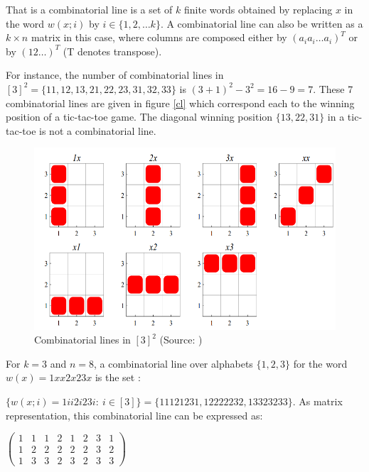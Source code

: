  That is a combinatorial line is a set of $k$ finite words obtained by replacing $x$ in the word $w(x;i)$ by $i \in \{1,2, \ldots k\}.$ A combinatorial line can also be written as a $k \times n$ matrix in this case, where columns are composed either by $(a_ia_i\ldots a_i)^T$ or by  $(12\ldots )^T$ (T denotes transpose).

For instance, the number of combinatorial lines in $[3]^2=\{11,12,13,21,22,23,31,32,33\}$ is $(3+1)^2-3^2=16-9=7.$ These 7 combinatorial lines are given in figure \eqref{cl} which correspond each to the winning position of a tic-tac-toe game. The diagonal winning position $\{13, 22,31\}$ in a tic-tac-toe is not a combinatorial line.
\begin{figure}[hbtp]
\centering
\includegraphics[scale=0.35]{cblines.png}
\caption{Combinatorial lines in $[3]^2$ (Source: \cite{polymath2010density})} \label{cl}
\end{figure}

For $k=3$ and $n=8$, a combinatorial line over alphabets $\{1,2,3\}$ for the word  $w(x)=1xx2x23x$ is the set :

$\{w(x;i)=1ii2i23i: \ i\in [3]\}=  \{11121231, 12222232, 13323233 \}.$ As matrix representation, this combinatorial line can be expressed as:

\begin{center}
$\left(\begin{array}{cccccccc}
1 & 1 & 1 & 2 & 1 & 2& 3 &1\\  1 & 2 & 2 & 2 & 2 & 2 & 3 & 2\\ 1 & 3 & 3 & 2 & 3 & 2 & 3 & 3 
\end{array}  \right)$
\end{center}



